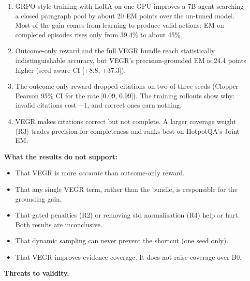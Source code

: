 \begin{enumerate}
\def\labelenumi{\arabic{enumi}.}
\tightlist
\item
  GRPO-style training with LoRA on one GPU improves a 7B agent searching
  a closed paragraph pool by about 20 EM points over the un-tuned model.
  Most of the gain comes from learning to produce valid actions: EM on
  completed episodes rises only from 39.4\% to about 45\%.
\item
  Outcome-only reward and the full VEGR bundle reach statistically
  indistinguishable accuracy, but VEGR's precision-grounded EM is 24.4
  points higher (seed-aware CI {[}+8.8, +37.3{]}).
\item
  The outcome-only reward dropped citations on two of three seeds
  (Clopper--Pearson 95\% CI for the rate {[}0.09, 0.99{]}). The training
  rollouts show why: invalid citations cost −1, and correct ones earn
  nothing.
\item
  VEGR makes citations correct but not complete. A larger coverage
  weight (R3) trades precision for completeness and ranks best on
  HotpotQA's Joint-EM.
\end{enumerate}

\textbf{What the results do not support:}

\begin{itemize}
\tightlist
\item
  That VEGR is more \emph{accurate} than outcome-only reward.
\item
  That any single VEGR term, rather than the bundle, is responsible for
  the grounding gain.
\item
  That gated penalties (R2) or removing std normalisation (R4) help or
  hurt. Both results are inconclusive.
\item
  That dynamic sampling can never prevent the shortcut (one seed only).
\item
  That VEGR improves evidence coverage. It does not raise coverage over
  B0.
\end{itemize}

\textbf{Threats to validity.}

